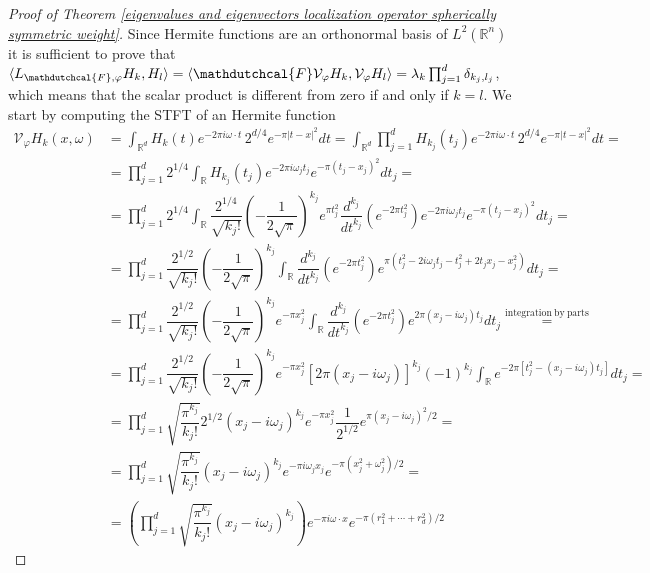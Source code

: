 \documentclass[corpo=11pt, stile=classica, tipotesi=custom,
greek, evenboxes, english]{toptesi}
\numberwithin{equation}{chapter}
\theoremstyle{remark}
\newcommand{\R}{\mathbb{R}} %
\newcommand{\V}{\mathcal{V}} %
\begin{document}
\begin{proof}[Proof of Theorem \ref{eigenvalues and eigenvectors localization operator spherically symmetric weight}]
	Since Hermite functions are an orthonormal basis of $L^2(\R^n)$ it is sufficient to prove that $\langle  L_{\mathdutchcal{F},\varphi}H_k,H_l\rangle = \langle \mathdutchcal{F} \V_{\varphi}H_k, \V_{\varphi}H_l \rangle =  \lambda_k \prod_{j=1}^d \delta_{k_j,l_j}$, which means that the scalar product is different from zero if and only if $k=l$. We start by computing the STFT of an Hermite function
	{\allowdisplaybreaks[1]
	\begin{align*}
		\V_{\varphi}H_k(x,\omega) &= \int_{\R^d} H_k(t) e^{-2\pi i \omega \cdot t}\, 2^{d/4} e^{-\pi|t-x|^2}dt = \int_{\R^d} \prod_{j=1}^d H_{k_j}(t_j) e^{-2\pi i \omega \cdot t}\, 2^{d/4} e^{-\pi|t-x|^2}dt =\\
		&= \prod_{j=1}^{d} 2^{1/4}\int_{\R} H_{k_j}(t_j) e^{-2\pi i \omega_j t_j} e^{-\pi(t_j-x_j)^2}dt_j =\\
		&= \prod_{j=1}^{d} 2^{1/4}\int_{\R} \dfrac{2^{1/4}}{\sqrt{k_j!}}\left(-\dfrac{1}{2\sqrt{\pi}}\right)^{k_j} e^{\pi t_j^2} \dfrac{d^{k_j}}{dt^{k_j}}\left(e^{-2\pi t_j^2}\right) e^{-2\pi i \omega_j t_j} e^{-\pi(t_j-x_j)^2}dt_j = \\
		&= \prod_{j=1}^d \dfrac{2^{1/2}}{\sqrt{k_j!}} \left(-\dfrac{1}{2\sqrt{\pi}}\right)^{k_j} \int_{\R} \dfrac{d^{k_j}}{dt^{k_j}}\left(e^{-2\pi t_j^2}\right) e^{\pi(t_j^2 - 2i\omega_j t_j -t_j^2 + 2t_j x_j - x_j^2)}dt_j = \\
		&= \prod_{j=1}^d \dfrac{2^{1/2}}{\sqrt{k_j!}} \left(-\dfrac{1}{2\sqrt{\pi}}\right)^{k_j} e^{-\pi x_j^2}\int_{\R} \dfrac{d^{k_j}}{dt^{k_j}}\left(e^{-2\pi t_j^2}\right) e^{2\pi(x_j - i\omega_j)t_j}dt_j \overset{\mathrm{integration\ by\  parts}}{=} \\
		&= \prod_{j=1}^d \dfrac{2^{1/2}}{\sqrt{k_j!}} \left(-\dfrac{1}{2\sqrt{\pi}}\right)^{k_j} e^{-\pi x_j^2} [2\pi(x_j - i\omega_j)]^{k_j} (-1)^{k_j}\int_{\R}  e^{-2\pi[t_j^2 - (x_j - i \omega_j)t_j]} dt_j =\\
		&=\prod_{j=1}^d \sqrt{\dfrac{\pi^{k_j}}{k_j!}}2^{1/2}( x_j - i\omega_j)^{k_j} e^{-\pi x_j^2} \dfrac{1}{2^{1/2}} e^{\pi (x_j - i \omega_j)^2/2} = \\
		&= \prod_{j=1}^d \sqrt{\dfrac{\pi^{k_j}}{k_j!}} (x_j - i \omega_j)^{k_j} e^{-\pi i \omega_j x_j} e^{-\pi(x_j^2 + \omega_j^2)/2} =\\
		&= \left(\prod_{j=1}^d \sqrt{\dfrac{\pi^{k_j}}{k_j!}} (x_j - i \omega_j)^{k_j} \right) e^{-\pi i \omega \cdot x} e^{-\pi(r_1^2 + \cdots + r_d^2)/2}

\end{align*}}
\end{proof}
\end{document}
